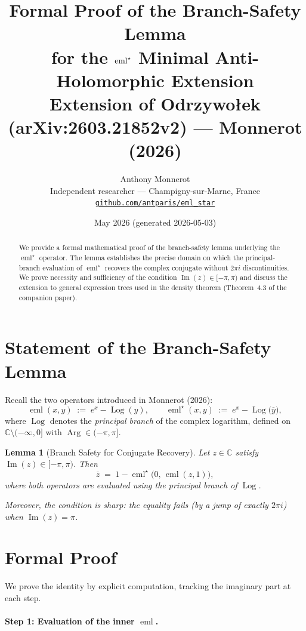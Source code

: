 \documentclass[11pt,a4paper]{article}
\title{\textbf{Formal Proof of the Branch-Safety Lemma}\\
       \large for the $\emlstar$ Minimal Anti-Holomorphic Extension\\[4pt]
       \normalsize Extension of Odrzywołek (arXiv:2603.21852v2) --- Monnerot (2026)}
\author{Anthony Monnerot\\
        \small Independent researcher --- Champigny-sur-Marne, France\\
        \small \href{https://github.com/antparis/eml_star}{\texttt{github.com/antparis/eml\_star}}}
\date{May 2026 \quad (generated 2026-05-03)}
\newtheorem{lemma}[theorem]{Lemma}
\theoremstyle{definition}
\newcommand{\eml}{\operatorname{eml}}
\newcommand{\emlstar}{\operatorname{eml}^\star}
\newcommand{\Log}{\operatorname{Log}}   %
\newcommand{\Arg}{\operatorname{Arg}}   %
\newcommand{\conj}[1]{\overline{#1}}
\newcommand{\C}{\mathbb{C}}
\newcommand{\im}{\operatorname{Im}}
\begin{document}
\maketitle

\begin{abstract}
We provide a formal mathematical proof of the branch-safety lemma underlying
the $\emlstar$ operator.  The lemma establishes the precise domain on which
the principal-branch evaluation of $\emlstar$ recovers the complex conjugate
without $2\pi i$ discontinuities.  We prove necessity and sufficiency of the
condition $\im(z)\in[-\pi,\pi)$ and discuss the extension to general
expression trees used in the density theorem (Theorem~4.3 of the companion
paper).
\end{abstract}

\section{Statement of the Branch-Safety Lemma}

Recall the two operators introduced in Monnerot (2026):
\[
  \eml(x,y)    \;:=\; e^x - \Log(y), \qquad
  \emlstar(x,y)\;:=\; e^x - \Log\!\bigl(\conj{y}\bigr),
\]
where $\Log$ denotes the \emph{principal branch} of the complex logarithm,
defined on $\C\setminus(-\infty,0]$ with $\Arg\in(-\pi,\pi]$.

\begin{lemma}[Branch Safety for Conjugate Recovery]
\label{lem:branch-safety}
Let $z\in\C$ satisfy $\im(z)\in[-\pi,\pi)$.  Then
\[
  \conj{z} \;=\; 1 - \emlstar\!\bigl(0,\,\eml(z,1)\bigr),
\]
where both operators are evaluated using the principal branch of $\Log$.

Moreover, the condition is \emph{sharp}: the equality fails (by a jump of
exactly $2\pi i$) when $\im(z)=\pi$.
\end{lemma}

\section{Formal Proof}
\label{sec:proof}

We prove the identity by explicit computation, tracking the imaginary part at
each step.

\paragraph{Step 1: Evaluation of the inner \texorpdfstring{$\eml$}{eml}.}
\end{document}
